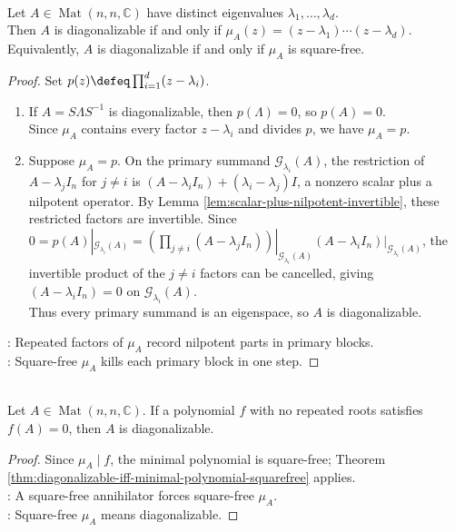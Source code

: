 \begin{theorem} \label{thm:diagonalizable-iff-minimal-polynomial-squarefree} \\
Let $A\in\operatorname{Mat}(n,n,\mathbb{C})$ have distinct eigenvalues $\lambda_1,\ldots,\lambda_d$.\\
Then $A$ is diagonalizable if and only if $\mu_A(z)=(z-\lambda_1)\cdots(z-\lambda_d)$.\\
Equivalently, $A$ is diagonalizable if and only if $\mu_A$ is square-free.
\begin{proof}
Set $p(z)\defeq\prod_{i=1}^{d}(z-\lambda_i)$.
\begin{enumerate}[label=\roman*.]
\setlength{\itemsep}{0pt}
\item[$(\Rightarrow)$] If $A=S\Lambda S^{-1}$ is diagonalizable, then $p(\Lambda)=0$, so $p(A)=0$.\\
Since $\mu_A$ contains every factor $z-\lambda_i$ and divides $p$, we have $\mu_A=p$.
\item[$(\Leftarrow)$] Suppose $\mu_A=p$. On the primary summand $\mathcal{G}_{\lambda_i}(A)$, the restriction of $A-\lambda_jI_n$ for $j\neq i$ is
$(A-\lambda_iI_n)+(\lambda_i-\lambda_j)I$, a nonzero scalar plus a nilpotent operator. By Lemma \ref{lem:scalar-plus-nilpotent-invertible}, these restricted factors are invertible. Since $0=p(A)|_{\mathcal{G}_{\lambda_i}(A)} =\left(\prod\limits_{j\neq i}(A-\lambda_jI_n)\right)|_{\mathcal{G}_{\lambda_i}(A)} (A-\lambda_iI_n)|_{\mathcal{G}_{\lambda_i}(A)}$, the invertible product of the $j\neq i$ factors can be cancelled, giving $(A-\lambda_iI_n)=0$ on $\mathcal{G}_{\lambda_i}(A)$.\\
Thus every primary summand is an eigenspace, so $A$ is diagonalizable.
\end{enumerate}
: Repeated factors of $\mu_A$ record nilpotent parts in primary blocks.\\
: Square-free $\mu_A$ kills each primary block in one step.
\end{proof}
\end{theorem}

\begin{corollary} \label{cor:squarefree-annihilator-implies-diagonalizable} \\
Let $A\in\operatorname{Mat}(n,n,\mathbb{C})$. If a polynomial $f$ with no repeated roots satisfies $f(A)=0$, then $A$ is diagonalizable.
\begin{proof}
Since $\mu_A\mid f$, the minimal polynomial is square-free; Theorem \ref{thm:diagonalizable-iff-minimal-polynomial-squarefree} applies.\\
: A square-free annihilator forces square-free $\mu_A$.\\
: Square-free $\mu_A$ means diagonalizable.
\end{proof}
\end{corollary}

